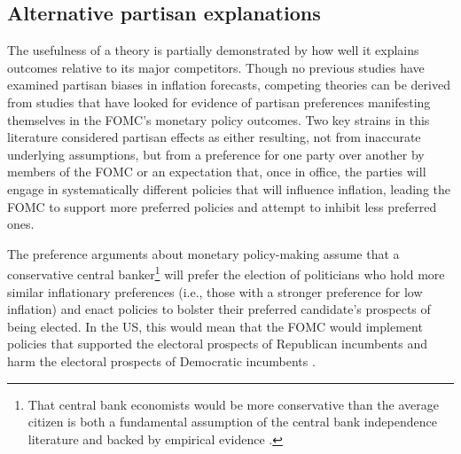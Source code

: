 \documentclass[a4paper]{article}
\begin{document}

\subsection{Alternative partisan explanations}

The usefulness of a theory is partially demonstrated by how well it explains outcomes relative to its major competitors. Though no previous studies have examined partisan biases in inflation forecasts, competing theories can be derived from studies that have looked for evidence of partisan preferences manifesting themselves in the FOMC's monetary policy outcomes. Two key strains in this literature considered partisan effects as either resulting, not from inaccurate underlying assumptions, but from a preference for one party over another by members of the FOMC or an expectation that, once in office, the parties will engage in systematically different policies that will influence inflation, leading the FOMC to support more preferred policies and attempt to inhibit less preferred ones. 

The preference arguments about monetary policy-making assume that a conservative central banker\footnote{That central bank economists would be more conservative than the average citizen is both a fundamental assumption of the central bank independence literature \citep[e.g.][]{Goodman1991} and backed by empirical evidence \citep[e.g.,][]{Scott1975,Stigler1959}.} will prefer the election of politicians who hold more similar inflationary preferences (i.e., those with a stronger preference for low inflation) and enact policies to bolster their preferred candidate's prospects of being elected. In the US, this would mean that the FOMC would implement policies that supported the electoral prospects of Republican incumbents and harm the electoral prospects of Democratic incumbents \citep{Clark2012,Hakes1988,Sieg1997,Tootell1996}.
\end{document}
